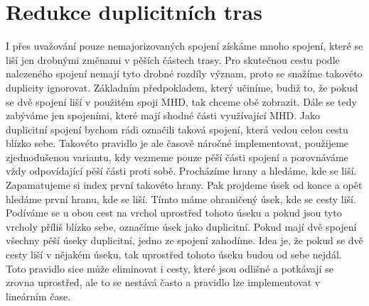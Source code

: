 \section{Redukce duplicitních tras}
I přes uvažování pouze nemajorizovaných spojení získáme mnoho spojení, které se
liší jen drobnými změnami v pěších částech trasy. Pro skutečnou cestu podle
nalezeného spojení nemají tyto drobné rozdíly význam, proto se snažíme takovéto
duplicity ignorovat. Základním předpokladem, který učiníme, budiž to, že pokud
se dvě spojení liší v použitém spoji MHD, tak chceme obě zobrazit. Dále se tedy
zabýváme jen spojeními, které mají shodné části využívající MHD. Jako duplicitní
spojení bychom rádi označili taková spojení, která vedou celou cestu blízko
sebe. Takovéto pravidlo je ale časově náročné implementovat, použijeme
zjednodušenou variantu, kdy vezmeme pouze pěší části spojení a porovnáváme vždy
odpovídající pěší části proti sobě. Procházíme hrany a hledáme, kde se liší.
Zapamatujeme si index první takovéto hrany. Pak projdeme úsek od konce a opět
hledáme první hranu, kde se liší. Tímto máme ohraničený úsek, kde se cesty liší.
Podíváme se u obou cest na vrchol uprostřed tohoto úseku a pokud jsou tyto
vrcholy příliš blízko sebe, označíme úsek jako duplicitní. Pokud mají dvě
spojení všechny pěší úseky duplicitní, jedno ze spojení zahodíme. Idea je, že
pokud se dvě cesty liší v nějakém úseku, tak uprostřed tohoto úseku budou od
sebe nejdál. Toto pravidlo sice může eliminovat i cesty, které jsou odlišné a
potkávají se zrovna uprostřed, ale to se nestává často a pravidlo lze
implementovat v lineárním čase.

